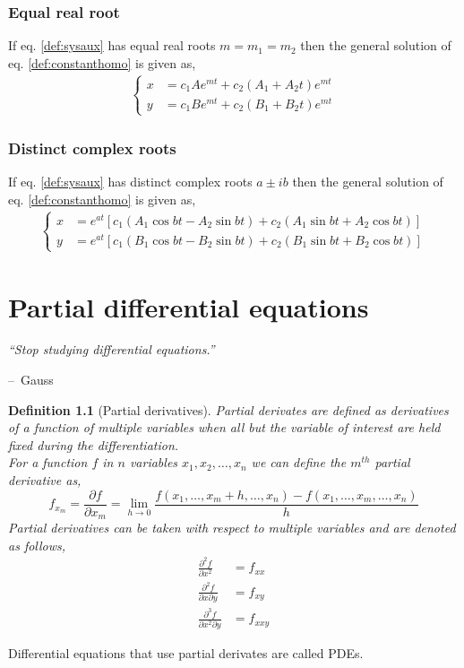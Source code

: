\documentclass[oneside,11pt,pdftex,final]{book}%
\makeatletter
\numberwithin{equation}{section}
\newenvironment{chapquote}[2][2em]
{\setlength{\@tempdima}{#1}%
	\def\chapquote@author{#2}%
	\parshape 1 \@tempdima \dimexpr\textwidth-2\@tempdima\relax%
	\itshape}
{\par\normalfont\hfill--\ \chapquote@author\hspace*{\@tempdima}\par\bigskip}
\newtheorem{definition}[theorem]{Definition}
\numberwithin{section}{chapter}
\numberwithin{equation}{chapter}
\makeatother
\begin{document}
\subsection{Equal real root}
If eq. \ref{def:sysaux} has equal real roots $m= m_1=m_2 $ then the general solution of eq. \ref{def:constanthomo} is given as,
\begin{align*}
	\begin{cases}
		x&=c_1Ae^{mt}+c_2(A_1+A_2t)e^{mt}\\
		y&=c_1Be^{mt}+c_2(B_1+B_2t)e^{mt}
	\end{cases}
\end{align*}

\subsection{Distinct complex roots}
If eq. \ref{def:sysaux} has distinct complex roots $a\pm ib $ then the general solution of eq. \ref{def:constanthomo} is given as,
\begin{align*}
	\begin{cases}
		x&=e^{at}[c_1(A_1 \cos bt - A_2 \sin bt)+c_2(A_1 \sin bt + A_2 \cos bt)]\\
		y&=e^{at}[c_1(B_1 \cos bt- B_2 \sin bt)+c_2(B_1 \sin bt + B_2 \cos bt)]
	\end{cases}
\end{align*}

\chapter{Partial differential equations}

\begin{chapquote}{Gauss}
	``Stop studying differential equations.''
\end{chapquote}


\begin{definition}[Partial derivatives]
	Partial derivates are defined as derivatives of a function of multiple variables when all but the variable of interest are held fixed during the differentiation.\\
	For a function $ f $ in $ n $ variables $ x_1,x_2,\dots, x_n $ we can define the $ m^{th} $ partial derivative as,
	\[ f_{x_m}=\frac{\partial f}{\partial x_m} = \lim_{h \rightarrow 0}\frac{f(x_1,\dots, x_m+h,\dots,x_n)-f(x_1,\dots,x_m, \dots,x_n)}{h}\]
	Partial derivatives can be taken with respect to multiple variables and are denoted as follows,
	\begin{align*}
		\frac{\partial^2 f}{\partial x^2}&=f_{xx}\\
		\frac{\partial^2 f}{\partial x \partial y}&=f_{xy}\\
		\frac{\partial^3 f}{\partial x^2 \partial y}&=f_{xxy}
	\end{align*}
\end{definition}
Differential equations that use partial derivates are called PDEs.
\end{document}
